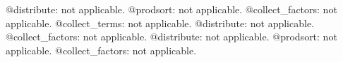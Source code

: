 \documentclass[11pt]{article}
\begin{document}
@distribute: not applicable.
@prodsort: not applicable.
@collect\_factors: not applicable.
@collect\_terms: not applicable.
@distribute: not applicable.
@collect\_factors: not applicable.
@distribute: not applicable.
@prodsort: not applicable.
@collect\_factors: not applicable.
\end{document}
